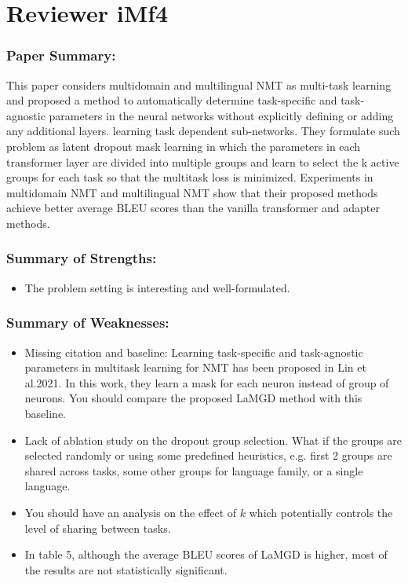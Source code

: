 \documentclass[12pt,times,a4paper,twoside]{article}
\theoremstyle{definition}
\begin{document}
\section*{Reviewer iMf4}
\subsubsection*{Paper Summary:}

This paper considers multidomain and multilingual NMT as multi-task learning and proposed a method to automatically determine task-specific and task-agnostic parameters in the neural networks without explicitly defining or adding any additional layers. learning task dependent sub-networks. They formulate such problem as latent dropout mask learning in which the parameters in each transformer layer are divided into multiple groups and learn to select the k active groups for each task so that the multitask loss is minimized. Experiments in multidomain NMT and multilingual NMT show that their proposed methods achieve better average BLEU scores than the vanilla transformer and adapter methods.

\subsubsection*{Summary of Strengths:}

\begin{itemize}
\item The problem setting is interesting and well-formulated.
\end{itemize}

\subsubsection*{Summary of Weaknesses:}

\begin{itemize}
\item Missing citation and baseline: Learning task-specific and task-agnostic parameters in multitask learning for NMT has been proposed in Lin et al.2021. In this work, they learn a mask for each neuron instead of group of neurons. You should compare the proposed LaMGD method with this baseline.
\item Lack of ablation study on the dropout group selection. What if the groups are selected randomly or using some predefined heuristics, e.g. first 2 groups are shared across tasks, some other groups for language family, or a single language.

\item You should have an analysis on the effect of $k$ which potentially controls the level of sharing between tasks.

\item In table 5, although the average BLEU scores of LaMGD is higher, most of the results are not statistically significant.
  \end{itemize}
\end{document}
